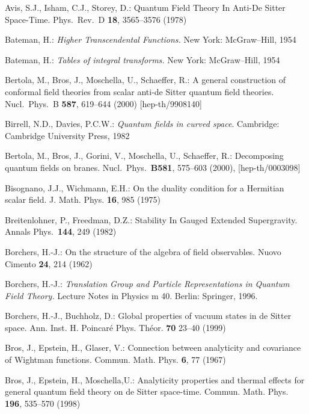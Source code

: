 \documentclass[a4paper,a4paper]{article}
\begin{document}
\begin{thebibliography}{99}


Avis, S.J., Isham, C.J., Storey, D.: Quantum Field Theory In
Anti-De Sitter Space-Time. Phys.\ Rev.\ D {\bf 18}, 3565--3576
(1978)

Bateman, H.: {\it Higher Transcendental Functions.} New York:
McGraw--Hill, 1954

Bateman, H.: {\it Tables of integral transforms.} New York:
McGraw--Hill, 1954

Bertola, M., Bros, J.,
Moschella, U.,  Schaeffer, R.: A general construction of
conformal field theories from scalar anti-de Sitter quantum field
theories. Nucl.\ Phys.\ B {\bf 587},  619--644 (2000)
[hep-th/9908140]

  Birrell,  N.D., Davies,  P.C.W.:
{\it Quantum fields in curved space}. Cambridge: Cambridge
University Press, 1982


Bertola, M., Bros, J., Gorini, V.,  Moschella, U.,  Schaeffer, R.:
Decomposing quantum fields on branes. Nucl.\ Phys.\ {\bf B581},
575--603 (2000),  [hep-th/0003098]


   Bisognano, J.J., Wichmann, E.H.:
{On the duality condition for a Hermitian scalar field}. J. Math.
Phys. {\bf 16}, 985 (1975)

Breitenlohner, P.,  Freedman, D.Z.: Stability In Gauged Extended
Supergravity. Annals Phys.\  {\bf 144}, 249 (1982)


  Borchers, H.-J.:
On the structure of the algebra of field observables. Nuovo
Cimento {\bf 24}, 214 (1962)

  Borchers, H.-J.:
{\it Translation Group and Particle Representations in
Quantum Field Theory.}
Lecture Notes in Physics m 40. Berlin: Springer, 1996.

 Borchers, H.-J., Buchholz, D.:
Global properties of vacuum states in de Sitter space. Ann. Inst.
H. Poincar\'e Phys. Th\'eor. {\bf 70} 23--40 (1999)

 Bros, J., Epstein, H., Glaser, V.:
{Connection between analyticity and covariance of Wightman functions.} Commun.
Math. Phys. {\bf 6}, 77 (1967)

 Bros, J., Epstein, H., Moschella,U.:
Analyticity properties and thermal effects for general quantum
field theory on de Sitter space-time. Commun. Math. Phys. {\bf
196}, 535--570 (1998)


\end{thebibliography}
\end{document}
